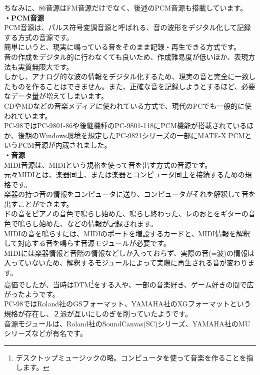 \documentclass[b5paper,9pt,platex,dvipdfmx]{jsarticle}
\begin{document}
\begin{multicols}{3}
\begin{enumerate}
  ちなみに、86音源はFM音源だけでなく、後述のPCM音源も搭載しています。\\
  {\bf ・PCM音源 \\}
  PCM音源は、パルス符号変調音源と呼ばれる、音の波形をデジタル化して記録する方式の音源です。\\
  簡単にいうと、現実に鳴っている音をそのまま記録・再生できる方式です。\\
  音の作成をデジタル的に行わなくても良いため、作成難易度が低いほか、表現方法も実質無限大です。\\
  しかし、アナログ的な波の情報をデジタル化するため、現実の音と完全に一致したものを作ることはできません。また、正確な音を記録しようとするほど、必要なデータ量が増えてしまいます。\\
  CDやMDなどの音楽メディアに使われている方式で、現代のPCでも一般的に使われています。\\
  PC-98ではPC-9801-86や後継機種のPC-9801-118にPCM機能が搭載されているほか、後期のWindows環境を想定したPC-9821シリーズの一部にMATE-X PCMというPCM音源が内蔵されました。\\
  {\bf ・音源 \\}
  MIDI音源は、MIDIという規格を使って音を出す方式の音源です。\\
  元々MIDIとは、楽器同士、または楽器とコンピュータ同士を接続するための規格です。\\
  楽器の持つ音の情報をコンピュータに送り、コンピュータがそれを解釈して音を出すことができます。\\
  ドの音をピアノの音色で鳴らし始めた、鳴らし終わった、レのおとをギターの音色で鳴らし始めた、などの情報が記録されます。\\
  MIDIの音を鳴らすには、MIDIのポートを増設するカードと、MIDI情報を解釈して対応する音を鳴らす音源モジュールが必要です。\\
  MIDIには楽器情報と音階の情報などしか入っておらず、実際の音(=波)の情報は入っていないため、解釈するモジュールによって実際に再生される音が変わります。\\
  高価でしたが、当時はDTM\footnote{デスクトップミュージックの略。コンピュータを使って音楽を作ることを指します。}をする人や、一部の音楽好き、ゲーム好きの間で広がったようです。\\
  PC-98ではRoland社のGSフォーマット、YAMAHA社のXGフォーマットという規格が存在し、２派が互いにしのぎを削っていたようです。\\
  音源モジュールは、Roland社のSoundCanvas(SC)シリーズ、YAMAHA社のMUシリーズなどが有名です。\\
\end{enumerate}
\end{multicols}
\end{document}
